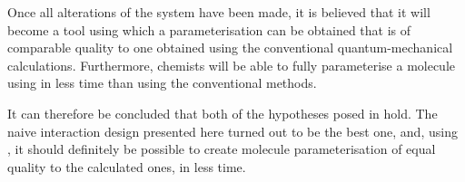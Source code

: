 Once all alterations of the system have been made, it is believed that it will become a tool using which a parameterisation can be obtained that is of comparable quality to one obtained using the conventional quantum-mechanical calculations. Furthermore, chemists will be able to fully parameterise a molecule using \oframp{} in less time than using the conventional methods.

It can therefore be concluded that both of the hypotheses posed in  hold. The naive interaction design presented here turned out to be the best one, and, using \oframp, it should definitely be possible to create molecule parameterisation of equal quality to the calculated ones, in less time.
